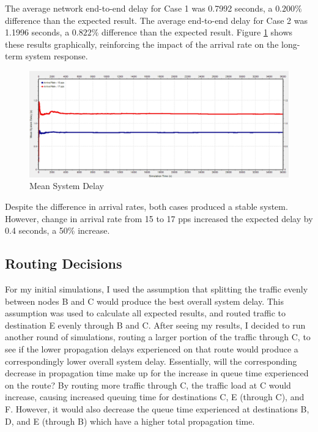 \documentclass{article}
\begin{document}
The average network end-to-end delay for Case 1 was 0.7992 seconds, a $0.200 \%$ difference than the expected result.
The average end-to-end delay for Case 2 was 1.1996 seconds, a $0.822 \%$ difference than the expected result.
Figure \ref{fig:meanSysDelay} shows these results graphically, reinforcing the impact of the arrival rate on the long-term system response.


\begin{figure}[h!]
\centering
\includegraphics[scale=0.55]{Images/MeanSysDelay.PNG}
\caption{Mean System Delay}
\label{fig:meanSysDelay}
\end{figure}

Despite the difference in arrival rates, both cases produced a stable system.
However, change in arrival rate from 15 to 17 pps increased the expected delay by 0.4 seconds, a 50\% increase.


\subsection{Routing Decisions}
For my initial simulations, I used the assumption that splitting the traffic evenly between nodes B and C would produce the best overall system delay.
This assumption was used to calculate all expected results, and routed traffic to destination E evenly through B and C.
After seeing my results, I decided to run another round of simulations, routing a larger portion of the traffic through C, to see if the lower propagation delays experienced on that route would produce a correspondingly lower overall system delay.
Essentially, will the corresponding decrease in propagation time make up for the increase in queue time experienced on the route?
By routing more traffic through C, the traffic load at C would increase, causing increased queuing time for destinations C, E (through C), and F.  
However, it would also decrease the queue time experienced at destinations B, D, and E (through B) which have a higher total propagation time.
\end{document}
